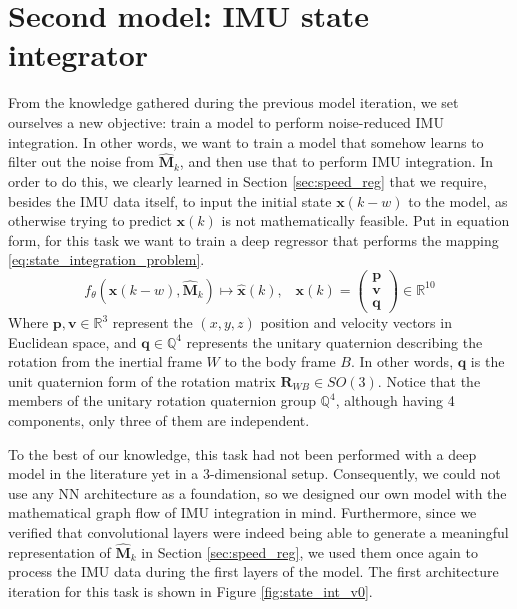 \section{Second model: IMU state integrator}\label{sec:imu_state_int}

From the knowledge gathered during the previous model iteration, we set ourselves a new objective: train a model to perform noise-reduced IMU integration. 
In other words, we want to train a model that somehow learns to filter out the noise from $\mathbf{\hat{M}}_k$, and then use that to perform IMU integration.
In order to do this, we clearly learned in Section \ref{sec:speed_reg} that we require, besides the IMU data itself, to input the initial state $\mathbf{x}(k-w)$ to the model, as otherwise trying to predict $\mathbf{x}(k)$ is not mathematically feasible.
Put in equation form, for this task we want to train a deep regressor that performs the mapping \ref{eq:state_integration_problem}.
\begin{equation}\label{eq:state_integration_problem}
    f_\theta\left(\mathbf{x}(k-w),\mathbf{\hat{M}}_k\right)\mapsto\mathbf{\hat{x}}(k), \;\;\; \mathbf{x}(k)=\begin{pmatrix}\mathbf{p}\\ \mathbf{v}\\ \mathbf{q}\end{pmatrix}\in \mathbb{R}^{10}
\end{equation}
Where $\mathbf{p}, \mathbf{v}\in\mathbb{R}^3$ represent the $(x,y,z)$ position and velocity vectors in Euclidean space, and $\mathbf{q}\in\mathbb{Q}^4$ represents the unitary quaternion describing the rotation from the inertial frame $W$ to the body frame $B$. 
In other words, $\mathbf{q}$ is the unit quaternion form of the rotation matrix $\mathbf{R}_{W\!B}\in SO(3)$.
Notice that the members of the unitary rotation quaternion group $\mathbb{Q}^4$, although having 4 components, only three of them are independent.

To the best of our knowledge, this task had not been performed with a deep model in the literature yet in a 3-dimensional setup.
Consequently, we could not use any NN architecture as a foundation, so we designed our own model with the mathematical graph flow of IMU integration in mind.
Furthermore, since we verified that convolutional layers were indeed being able to generate a meaningful representation of $\mathbf{\hat{M}}_k$ in Section \ref{sec:speed_reg}, we used them once again to process the IMU data during the first layers of the model. 
The first architecture iteration for this task is shown in Figure \ref{fig:state_int_v0}.

